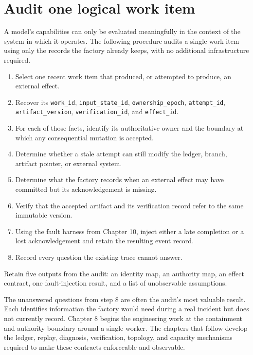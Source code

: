 \hypertarget{audit-one-logical-work-item}{%
\section{Audit one logical work item}\label{audit-one-logical-work-item}}

A model's capabilities can only be evaluated meaningfully in the context of the system in which it operates. The following procedure audits a single work item using only the records the factory already keeps, with no additional infrastructure required.

\begin{enumerate}
\tightlist
\item
  Select one recent work item that produced, or attempted to produce, an external effect.
\item
  Recover its \texttt{work\_id}, \texttt{input\_state\_id}, \texttt{ownership\_epoch}, \texttt{attempt\_id}, \texttt{artifact\_version}, \texttt{verification\_id}, and \texttt{effect\_id}.
\item
  For each of those facts, identify its authoritative owner and the boundary at which any consequential mutation is accepted.
\item
  Determine whether a stale attempt can still modify the ledger, branch, artifact pointer, or external system.
\item
  Determine what the factory records when an external effect may have committed but its acknowledgement is missing.
\item
  Verify that the accepted artifact and its verification record refer to the same immutable version.
\item
  Using the fault harness from Chapter 10, inject either a late completion or a lost acknowledgement and retain the resulting event record.
\item
  Record every question the existing trace cannot answer.
\end{enumerate}

Retain five outputs from the audit: an identity map, an authority map, an effect contract, one fault-injection result, and a list of unobservable assumptions.

The unanswered questions from step 8 are often the audit's most valuable result. Each identifies information the factory would need during a real incident but does not currently record. Chapter 8 begins the engineering work at the containment and authority boundary around a single worker. The chapters that follow develop the ledger, replay, diagnosis, verification, topology, and capacity mechanisms required to make these contracts enforceable and observable.

